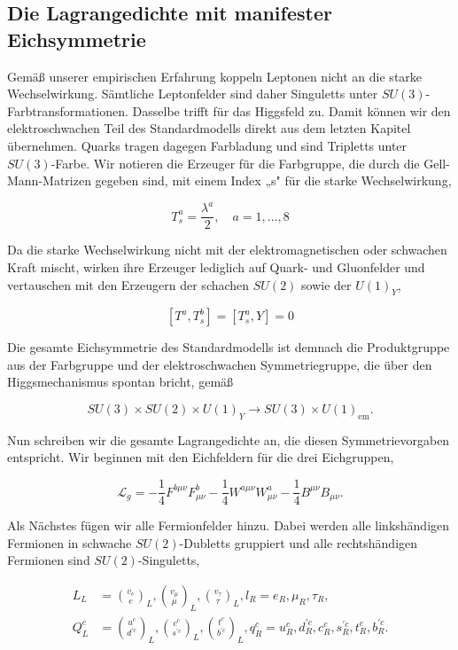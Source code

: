 \documentclass[10pt, letterpaper]{article}
\begin{document}
\subsection*{Die Lagrangedichte mit manifester Eichsymmetrie}
Gemäß unserer empirischen Erfahrung koppeln Leptonen nicht an die starke Wechselwirkung. Sämtliche Leptonfelder sind daher Singuletts unter $S U(3)$-Farbtransformationen. Dasselbe trifft für das Higgsfeld zu. Damit können wir den elektroschwachen Teil des Standardmodells direkt aus dem letzten Kapitel übernehmen. Quarks tragen dagegen Farbladung und sind Tripletts unter $S U(3)$-Farbe. Wir notieren die Erzeuger für die Farbgruppe, die durch die Gell-Mann-Matrizen gegeben sind, mit einem Index „s" für die starke Wechselwirkung,

$$
T_{s}^{a}=\frac{\lambda^{a}}{2}, \quad a=1, \ldots, 8
$$

Da die starke Wechselwirkung nicht mit der elektromagnetischen oder schwachen Kraft mischt, wirken ihre Erzeuger lediglich auf Quark- und Gluonfelder und vertauschen mit den Erzeugern der schachen $S U(2)$ sowie der $U(1)_{Y}$,

$$
\left[T^{a}, T_{s}^{b}\right]=\left[T_{s}^{a}, Y\right]=0
$$

Die gesamte Eichsymmetrie des Standardmodells ist demnach die Produktgruppe aus der Farbgruppe und der elektroschwachen Symmetriegruppe, die über den Higgsmechanismus spontan bricht, gemäß

$$
S U(3) \times S U(2) \times U(1)_{Y} \rightarrow S U(3) \times U(1)_{\mathrm{em}} .
$$

Nun schreiben wir die gesamte Lagrangedichte an, die diesen Symmetrievorgaben entspricht. Wir beginnen mit den Eichfeldern für die drei Eichgruppen,

$$
\mathscr{L}_{g}=-\frac{1}{4} F^{b \mu \nu} F_{\mu \nu}^{b}-\frac{1}{4} W^{a \mu \nu} W_{\mu \nu}^{a}-\frac{1}{4} B^{\mu \nu} B_{\mu \nu} .
$$

Als Nächstes fügen wir alle Fermionfelder hinzu. Dabei werden alle linkshändigen Fermionen in schwache $S U(2)$-Dubletts gruppiert und alle rechtshändigen Fermionen sind $S U(2)$-Singuletts,

$$
\begin{aligned}
L_{L} & =\binom{v_{e}}{e}_{L},\binom{v_{\mu}}{\mu}_{L},\binom{v_{\tau}}{\tau}_{L}, l_{R}=e_{R}, \mu_{R}, \tau_{R}, \\
Q_{L}^{c} & =\binom{u^{c}}{d^{\prime c}}_{L},\binom{c^{c}}{s^{\prime c}}_{L},\binom{t^{c}}{b^{\prime c}}_{L}, q_{R}^{c}=u_{R}^{c}, d_{R}^{\prime c}, c_{R}^{c}, s_{R}^{\prime c}, t_{R}^{c}, b_{R}^{\prime c} .
\end{aligned}
$$
\end{document}
